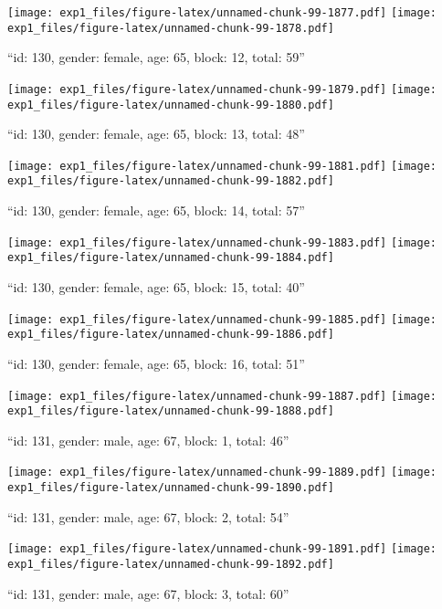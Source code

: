 \documentclass[,]{article}
\begin{document}
\texttt{[image: exp1\_files/figure-latex/unnamed-chunk-99-1877.pdf]}
\texttt{[image: exp1\_files/figure-latex/unnamed-chunk-99-1878.pdf]}

\newpage
[1] 

``id: 130, gender: female, age: 65, block: 12, total: 59''

\texttt{[image: exp1\_files/figure-latex/unnamed-chunk-99-1879.pdf]}
\texttt{[image: exp1\_files/figure-latex/unnamed-chunk-99-1880.pdf]}

\newpage
[1] 

``id: 130, gender: female, age: 65, block: 13, total: 48''

\texttt{[image: exp1\_files/figure-latex/unnamed-chunk-99-1881.pdf]}
\texttt{[image: exp1\_files/figure-latex/unnamed-chunk-99-1882.pdf]}

\newpage
[1] 

``id: 130, gender: female, age: 65, block: 14, total: 57''

\texttt{[image: exp1\_files/figure-latex/unnamed-chunk-99-1883.pdf]}
\texttt{[image: exp1\_files/figure-latex/unnamed-chunk-99-1884.pdf]}

\newpage
[1] 

``id: 130, gender: female, age: 65, block: 15, total: 40''

\texttt{[image: exp1\_files/figure-latex/unnamed-chunk-99-1885.pdf]}
\texttt{[image: exp1\_files/figure-latex/unnamed-chunk-99-1886.pdf]}

\newpage
[1] 

``id: 130, gender: female, age: 65, block: 16, total: 51''

\texttt{[image: exp1\_files/figure-latex/unnamed-chunk-99-1887.pdf]}
\texttt{[image: exp1\_files/figure-latex/unnamed-chunk-99-1888.pdf]}

\newpage
[1] 

``id: 131, gender: male, age: 67, block: 1, total: 46''

\texttt{[image: exp1\_files/figure-latex/unnamed-chunk-99-1889.pdf]}
\texttt{[image: exp1\_files/figure-latex/unnamed-chunk-99-1890.pdf]}

\newpage
[1] 

``id: 131, gender: male, age: 67, block: 2, total: 54''

\texttt{[image: exp1\_files/figure-latex/unnamed-chunk-99-1891.pdf]}
\texttt{[image: exp1\_files/figure-latex/unnamed-chunk-99-1892.pdf]}

\newpage
[1] 

``id: 131, gender: male, age: 67, block: 3, total: 60''
\end{document}
